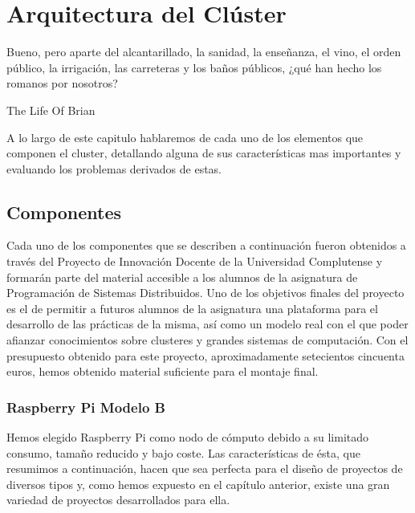 \newpage
\chapter{Arquitectura del Clúster}
\label{ch:capitulo2.tex}

\begin{FraseCelebre}
	\begin{Frase}
		Bueno, pero aparte del alcantarillado, la sanidad, la enseñanza, el vino, el orden público, la irrigación, las carreteras y los baños públicos, ¿qué han hecho los romanos por nosotros?
	\end{Frase}
	\begin{Fuente}
	The Life Of Brian
	\end{Fuente}
\end{FraseCelebre}

A lo largo de este capitulo hablaremos de cada uno de los elementos que componen el cluster, detallando alguna de sus características mas importantes y evaluando los problemas derivados de estas.

\section{Componentes}
\label{makereference2.1}

Cada uno de los componentes que se describen a continuación fueron obtenidos a través del Proyecto de Innovación Docente de la Universidad Complutense y formarán parte del material accesible a los alumnos de la asignatura de Programación de Sistemas Distribuidos. Uno de los objetivos finales del proyecto es el de permitir a futuros alumnos de la asignatura una plataforma para el desarrollo de las prácticas de la misma, así como un modelo real con el que poder afianzar conocimientos sobre clusteres y grandes sistemas de computación. Con el presupuesto obtenido para este proyecto, aproximadamente setecientos cincuenta euros, hemos obtenido material suficiente para el montaje final.

\subsection{Raspberry Pi Modelo B}

Hemos elegido Raspberry Pi como nodo de cómputo debido a su limitado consumo, tamaño reducido y bajo coste. Las características de ésta, que resumimos a continuación, hacen que sea perfecta para el diseño de proyectos de diversos tipos y, como hemos expuesto en el capítulo anterior, existe una gran variedad de proyectos desarrollados para ella. 

